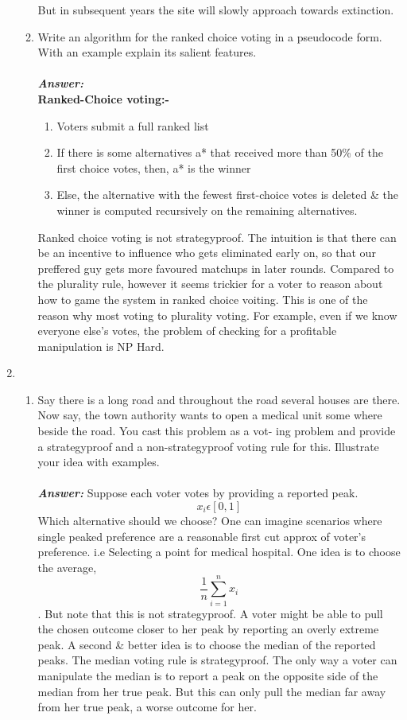 \documentclass[12pt]{article}
\begin{document}
\begin{enumerate}
\begin{enumerate}
But in subsequent years the site will slowly approach towards extinction.\\
\item Write an algorithm for the ranked choice voting in a pseudocode
form. With an example explain its salient features.\\\\
\textbf{\emph{Answer: }}\\ \textbf{Ranked-Choice voting:-}
\begin{enumerate}
\item Voters submit a full ranked list
\item If there is some alternatives a* that received more than 50\% of the first choice votes,
then, a* is the winner
\item Else, the alternative with the fewest first-choice votes is deleted \& the winner is computed recursively on the remaining alternatives.
\end{enumerate}
Ranked choice voting is not strategyproof. The intuition is that there can be an incentive to influence who gets eliminated early on, so that our preffered guy gets more favoured matchups in later rounds. Compared to the plurality rule, however it seems trickier for a voter to reason about how to game the system in ranked choice voiting. This is one of the reason why most voting to plurality voting.
For example, even if we know everyone else's votes, the problem of checking for a profitable manipulation is NP Hard.\\
\end{enumerate}
\item
\begin{enumerate}
\item Say there is a long road and throughout the road several houses
are there. Now say, the town authority wants to open a medical
unit some where beside the road. You cast this problem as a vot-
ing problem and provide a strategyproof and a non-strategyproof
voting rule for this. Illustrate your idea with examples.\\\\
\textbf{\emph{Answer: }} Suppose each voter votes by providing a reported peak. \[x_i\epsilon [0,1]\] Which alternative should we choose?
One can imagine scenarios where single peaked preference are a reasonable first cut approx of voter's preference. i.e Selecting a point for medical hospital.
One idea is to choose the average, \[\frac{1}{n} \sum_{i=1}^{n} x_i\]. But note that this is not strategyproof. A voter might be able to pull the chosen outcome closer to her peak by reporting an overly extreme peak. A second \& better idea is to choose the median of the reported peaks. The median voting rule is strategyproof. The only way a voter can manipulate the median is to report a peak on the opposite side of the median from her true peak. But this can only pull the median far away from her true peak, a worse outcome for her.

\end{enumerate}
\end{enumerate}
\end{document}
